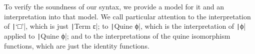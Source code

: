 \begin{code}
\\
\>[0]\<[3]%
\>[3] \AgdaSymbol{:}  \AgdaSymbol{\{}  \AgdaSymbol{\}}\<%
\\
\>[3]\<[4]%
\>[4]  \AgdaSymbol{\{}  \AgdaSymbol{\}} \AgdaSymbol{(} \AgdaSymbol{(}      \AgdaSymbol{))}\<%
\\
\>[3]\<[4]%
\>[4]  \AgdaSymbol{\{}  \AgdaSymbol{\}} \AgdaSymbol{(} \AgdaSymbol{(}    \AgdaSymbol{))}\<%
\\
\>[3]\<[4]%
\>[4]  \AgdaSymbol{\{}  \AgdaSymbol{\}} \AgdaSymbol{(} \AgdaSymbol{(}    \AgdaSymbol{))}\<%
\\
%
\\
\>  \AgdaSymbol{:}     \AgdaSymbol{\_}\<%
\\
\>  \AgdaSymbol{=}  \AgdaSymbol{\{}\AgdaSymbol{\}}\<%
\end{code}

 To verify the soundness of our syntax, we provide a model for it and
 an interpretation into that model.  We call particular attention to
 the interpretation of \texttt|‘□’|, which is just
 \texttt|Term {ε}|; to \texttt|Quine ϕ|, which is
 the interpretation of \texttt|ϕ| applied to
 \texttt|Quine ϕ|; and to the interpretations of the quine
 isomorphism functions, which are just the identity functions.

